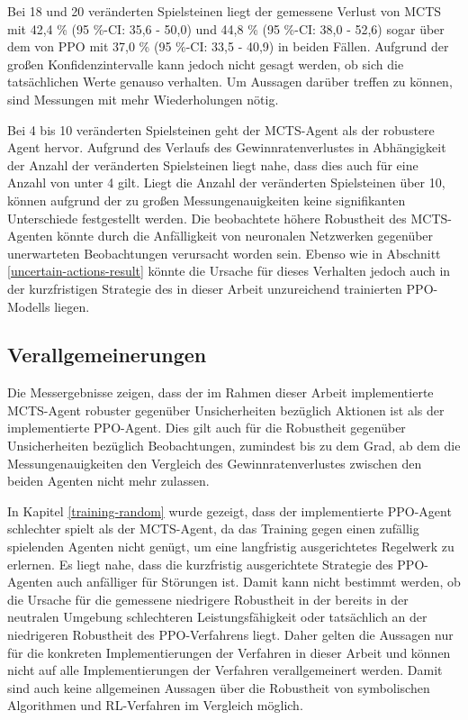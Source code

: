 Bei 18 und 20 veränderten Spielsteinen liegt der gemessene Verlust von MCTS mit 42,4 \% (95 \%-CI: 35,6 - 50,0) und 44,8 \% (95 \%-CI: 38,0 - 52,6) sogar über dem von PPO mit 37,0 \% (95 \%-CI: 33,5 - 40,9) in beiden Fällen. Aufgrund der großen Konfidenzintervalle kann jedoch nicht gesagt werden, ob sich die tatsächlichen Werte genauso verhalten. Um Aussagen darüber treffen zu können, sind Messungen mit mehr Wiederholungen nötig.

Bei 4 bis 10 veränderten Spielsteinen geht der MCTS-Agent als der robustere Agent hervor. Aufgrund des Verlaufs des Gewinnratenverlustes in Abhängigkeit der Anzahl der veränderten Spielsteinen liegt nahe, dass dies auch für eine Anzahl von unter 4 gilt. Liegt die Anzahl der veränderten Spielsteinen über 10, können aufgrund der zu großen Messungenauigkeiten keine signifikanten Unterschiede festgestellt werden. Die beobachtete höhere Robustheit des MCTS-Agenten könnte durch die Anfälligkeit von neuronalen Netzwerken gegenüber unerwarteten Beobachtungen verursacht worden sein. Ebenso wie in Abschnitt \ref{uncertain-actions-result} könnte die Ursache für dieses Verhalten jedoch auch in der kurzfristigen Strategie des in dieser Arbeit unzureichend trainierten PPO-Modells liegen.

\subsection{Verallgemeinerungen}

Die Messergebnisse zeigen, dass der im Rahmen dieser Arbeit implementierte MCTS-Agent robuster gegenüber Unsicherheiten bezüglich Aktionen ist als der implementierte PPO-Agent. Dies gilt auch für die Robustheit gegenüber Unsicherheiten bezüglich Beobachtungen, zumindest bis zu dem Grad, ab dem die Messungenauigkeiten den Vergleich des Gewinnratenverlustes zwischen den beiden Agenten nicht mehr zulassen.

In Kapitel \ref{training-random} wurde gezeigt, dass der implementierte PPO-Agent schlechter spielt als der MCTS-Agent, da das Training gegen einen zufällig spielenden Agenten nicht genügt, um eine langfristig ausgerichtetes Regelwerk zu erlernen. Es liegt nahe, dass die kurzfristig ausgerichtete Strategie des PPO-Agenten auch anfälliger für Störungen ist. Damit kann nicht bestimmt werden, ob die Ursache für die gemessene niedrigere Robustheit in der bereits in der neutralen Umgebung schlechteren Leistungsfähigkeit oder tatsächlich an der niedrigeren Robustheit des PPO-Verfahrens liegt. Daher gelten die Aussagen nur für die konkreten Implementierungen der Verfahren in dieser Arbeit und können nicht auf alle Implementierungen der Verfahren verallgemeinert werden. Damit sind auch keine allgemeinen Aussagen über die Robustheit von symbolischen Algorithmen und RL-Verfahren im Vergleich möglich.


